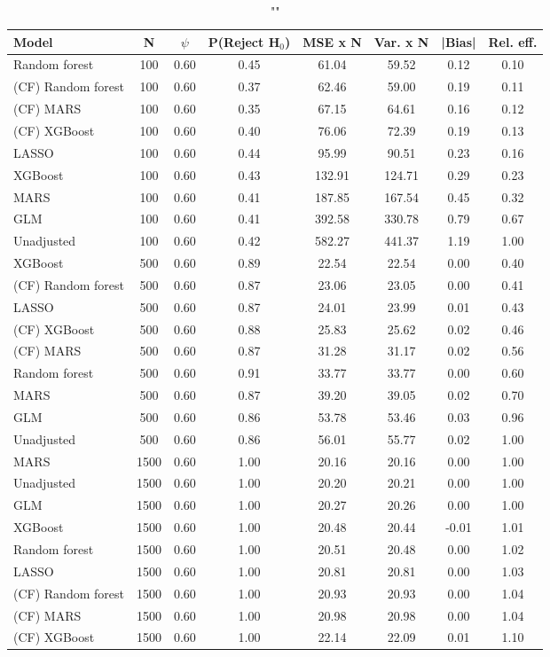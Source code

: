 \begin{table}
\centering
\caption{""}
\begin{tabular}{lccccccc}
\toprule
Model & N & $\psi$ & P(Reject H$_0$) & MSE x N & Var. x N & |Bias| & Rel. eff.\\ \midrule
Random forest & 100 & 0.60 & 0.45 &  61.04 &  59.52 &  0.12 & 0.10 \\ 
(CF) Random forest & 100 & 0.60 & 0.37 &  62.46 &  59.00 &  0.19 & 0.11 \\ 
(CF) MARS & 100 & 0.60 & 0.35 &  67.15 &  64.61 &  0.16 & 0.12 \\ 
(CF) XGBoost & 100 & 0.60 & 0.40 &  76.06 &  72.39 &  0.19 & 0.13 \\ 
LASSO & 100 & 0.60 & 0.44 &  95.99 &  90.51 &  0.23 & 0.16 \\ 
XGBoost & 100 & 0.60 & 0.43 & 132.91 & 124.71 &  0.29 & 0.23 \\ 
MARS & 100 & 0.60 & 0.41 & 187.85 & 167.54 &  0.45 & 0.32 \\ 
GLM & 100 & 0.60 & 0.41 & 392.58 & 330.78 &  0.79 & 0.67 \\ 
Unadjusted & 100 & 0.60 & 0.42 & 582.27 & 441.37 &  1.19 & 1.00 \\ \addlinespace 
XGBoost & 500 & 0.60 & 0.89 &  22.54 &  22.54 &  0.00 & 0.40 \\ 
(CF) Random forest & 500 & 0.60 & 0.87 &  23.06 &  23.05 &  0.00 & 0.41 \\ 
LASSO & 500 & 0.60 & 0.87 &  24.01 &  23.99 &  0.01 & 0.43 \\ 
(CF) XGBoost & 500 & 0.60 & 0.88 &  25.83 &  25.62 &  0.02 & 0.46 \\ 
(CF) MARS & 500 & 0.60 & 0.87 &  31.28 &  31.17 &  0.02 & 0.56 \\ 
Random forest & 500 & 0.60 & 0.91 &  33.77 &  33.77 &  0.00 & 0.60 \\ 
MARS & 500 & 0.60 & 0.87 &  39.20 &  39.05 &  0.02 & 0.70 \\ 
GLM & 500 & 0.60 & 0.86 &  53.78 &  53.46 &  0.03 & 0.96 \\ 
Unadjusted & 500 & 0.60 & 0.86 &  56.01 &  55.77 &  0.02 & 1.00 \\ \addlinespace 
MARS & 1500 & 0.60 & 1.00 &  20.16 &  20.16 &  0.00 & 1.00 \\ 
Unadjusted & 1500 & 0.60 & 1.00 &  20.20 &  20.21 &  0.00 & 1.00 \\ 
GLM & 1500 & 0.60 & 1.00 &  20.27 &  20.26 &  0.00 & 1.00 \\ 
XGBoost & 1500 & 0.60 & 1.00 &  20.48 &  20.44 & -0.01 & 1.01 \\ 
Random forest & 1500 & 0.60 & 1.00 &  20.51 &  20.48 &  0.00 & 1.02 \\ 
LASSO & 1500 & 0.60 & 1.00 &  20.81 &  20.81 &  0.00 & 1.03 \\ 
(CF) Random forest & 1500 & 0.60 & 1.00 &  20.93 &  20.93 &  0.00 & 1.04 \\ 
(CF) MARS & 1500 & 0.60 & 1.00 &  20.98 &  20.98 &  0.00 & 1.04 \\ 
(CF) XGBoost & 1500 & 0.60 & 1.00 &  22.14 &  22.09 &  0.01 & 1.10 \\
\bottomrule
\end{tabular}
\end{table}

